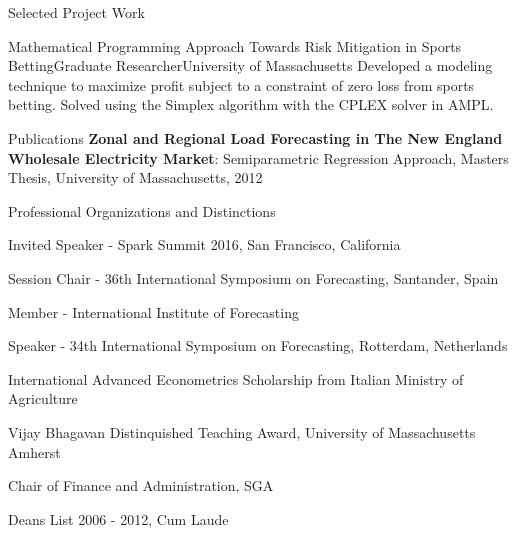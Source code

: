 \documentclass{resume} %
\begin{document}
\begin{rSection}{Selected Project Work}
	\begin{rSubsection}{Mathematical Programming Approach Towards Risk Mitigation in Sports Betting}{}{Graduate Researcher}{University of Massachusetts}
	Developed a modeling technique to maximize profit subject to a constraint of zero loss from sports betting. Solved using the Simplex algorithm with the CPLEX solver in AMPL.
	\end{rSubsection} 

	\end{rSection}
	


  \begin{rSection}{Publications}
  {\bf  Zonal and Regional Load Forecasting in The New England Wholesale Electricity Market}: Semiparametric Regression Approach, Masters Thesis, University of Massachusetts, 2012
  \end{rSection}



	\begin{rSection}{Professional Organizations and Distinctions}

  \item Invited Speaker -  Spark Summit 2016, San Francisco, California
  \item Session Chair -  36th International Symposium on Forecasting, Santander, Spain
  \item Member - International Institute of Forecasting
  \item Speaker -  34th International Symposium on Forecasting, Rotterdam, Netherlands
  \item International Advanced Econometrics Scholarship from Italian Ministry of Agriculture
  \item Vijay Bhagavan Distinquished Teaching Award, University of Massachusetts Amherst
  \item Chair of Finance and Administration, SGA
  \item Deans List 2006 - 2012, Cum Laude

	\end{rSection}

	
\end{document}
